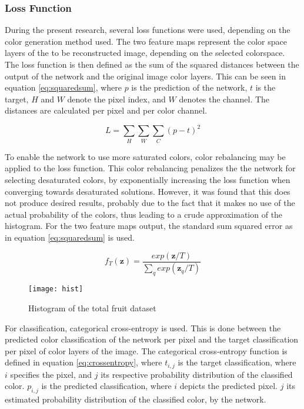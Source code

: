 \subsubsection{Loss Function}
During the present research, several loss functions were used, depending on the color generation method used.
The two feature maps represent the color space layers of the to be reconstructed image, depending on the selected colorspace. The loss function is then defined as the sum of the squared distances between the output of the network and the original image color layers. This can be seen in equation \ref{eq:squaredsum}, where $p$ is the prediction of the network, $t$ is the target, $H$ and $W$ denote the pixel index, and $W$ denotes the channel. The distances are calculated per pixel and per color channel.

\begin{equation}
\label{eq:squaredsum}
L = \sum_{H}\sum_{W} \sum_{C}(p - t)^2
\end{equation}

To enable the network to use more saturated colors, color rebalancing may be applied to the loss function. This color rebalancing penalizes the the network for selecting desaturated colors, by exponentially increasing the loss function when converging towards desaturated solutions. However, it was found that this does not produce desired results, probably due to the fact that it makes no use of the actual probability of the colors, thus leading to a crude approximation of the histogram. For the two feature maps output, the standard sum squared error as in equation \ref{eq:squaredsum} is used.

\begin{equation}
f_{T}(\textbf{z})=\frac{exp(\textbf{z}/T)}{\sum_q^{}exp(\textbf{z}_{q}/T)}
\label{eq:anmean}
\end{equation}\begin{wrapfigure}{R}{0.5\textwidth}
	\vspace{-20pt}
	\begin{center}
		\texttt{[image: hist]}
	\end{center}
	\caption{Histogram of the total fruit dataset}
	\label{fig:histogram}
	\vspace{20pt}
\end{wrapfigure}

For classification, categorical cross-entropy is used. This is done between the predicted color classification of the network per pixel and the target classification per pixel of color layers of the image. The categorical cross-entropy function is defined in equation \ref{eq:crossentropy}, where $t_{i,j}$ is the target classification, where $i$ specifies the pixel, and $j$ its respective probability distribution of the classified color. 
$p_{i,j}$ is the predicted classification, where $i$ depicts the predicted pixel. $j$ its estimated probability distribution of the classified color, by the network.

